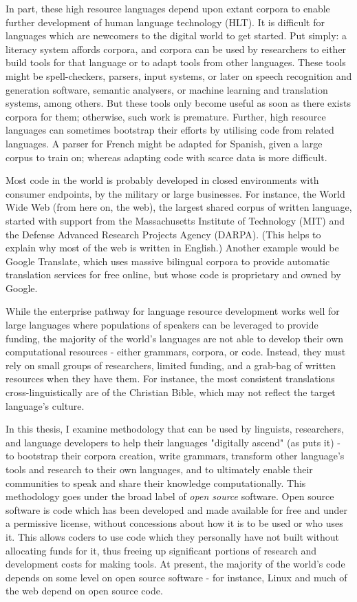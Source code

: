 In part, these high resource languages depend upon extant corpora to enable further development of human language technology (HLT). It is difficult for languages which are newcomers to the digital world to get started. %
Put simply: a literacy system affords corpora, and corpora can be used by researchers to either build tools for that language or to adapt tools from other languages. These tools might be spell-checkers, parsers, input systems, or later on speech recognition and generation software, semantic analysers, or machine learning and translation systems, among others. But these tools only become useful as soon as there exists corpora for them; otherwise, such work is premature. Further, high resource languages can sometimes bootstrap their efforts by utilising code from related languages. A parser for French might be adapted for Spanish, given a large corpus to train on; whereas adapting code with scarce data is more difficult.

Most code in the world is probably developed in closed environments with consumer endpoints, by the military or large businesses. For instance, the World Wide Web (from here on, the web), the largest shared corpus of written language, started with support from  the Massachusetts Institute of Technology (MIT) and the Defense Advanced Research Projects Agency (DARPA). (This helps to explain why most of the web is written in English.) Another example would be Google Translate, which uses massive bilingual corpora to provide automatic translation services for free online, but whose code is proprietary and owned by Google.

While the enterprise pathway for language resource development works well for large languages where populations of speakers can be leveraged to provide funding, the majority of the world's languages are not able to develop their own computational resources - either grammars, corpora, or code. Instead, they must rely on small groups of researchers, limited funding, and a grab-bag of written resources when they have them. For instance, the most consistent translations cross-linguistically are of the Christian Bible, which may not reflect the target language's culture.

In this thesis, I examine methodology that can be used by linguists, researchers, and language developers to help their languages "digitally ascend" (as \citet{kornai2013digital} puts it) - to bootstrap their corpora creation, write grammars, transform other language's tools and research to their own languages, and to ultimately enable their communities to speak and share their knowledge computationally. This methodology goes under the broad label of \textit{open source} software. Open source software is code which has been developed and made available for free and under a permissive license, without concessions about how it is to be used or who uses it. This allows coders to use code which they personally have not built without allocating funds for it, thus freeing up significant portions of research and development costs for making tools. At present, the majority of the world's code depends on some level on open source software - for instance, Linux and much of the web depend on open source code.

